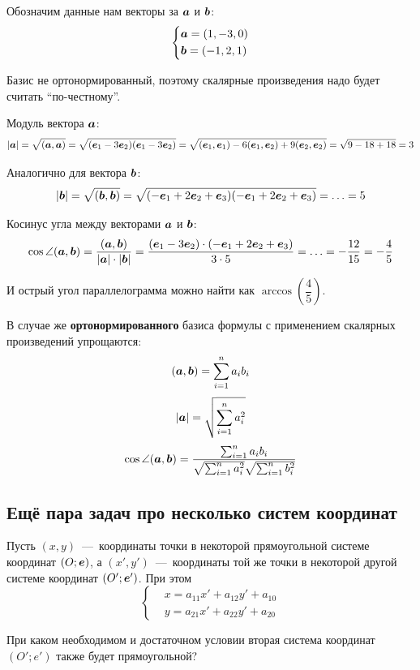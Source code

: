 \documentclass[a4paper,12pt]{article}
\begin{document}
  \begin{solution}
    Обозначим данные нам векторы за $\boldsymbol a$ и $\boldsymbol b$:
    \[
      \left\{
        \begin{aligned}
          &\boldsymbol a = (1, -3, 0)\\
          &\boldsymbol b = (-1, 2, 1)
        \end{aligned}
      \right.
    \]
    
    Базис не ортонормированный, поэтому скалярные произведения надо будет считать ``по-честному''.
    
    Модуль вектора $\boldsymbol a$:
    \[
      |\boldsymbol a| = \sqrt{(\boldsymbol a, \boldsymbol a)} = \sqrt{(\boldsymbol e_1 - 3\boldsymbol e_2)(\boldsymbol e_1 - 3\boldsymbol e_2)}
        = \sqrt{(\boldsymbol e_1, \boldsymbol e_1) - 6(\boldsymbol e_1, \boldsymbol e_2) + 9(\boldsymbol e_2, \boldsymbol e_2)}
        = \sqrt{9 - 18 + 18} = 3
    \]
    
    Аналогично для вектора $\boldsymbol b$:
    \[
      |\boldsymbol b| = \sqrt{(\boldsymbol b, \boldsymbol b)} = \sqrt{(-\boldsymbol e_1 + 2\boldsymbol e_2 + \boldsymbol e_3)(-\boldsymbol e_1 + 2\boldsymbol e_2 + \boldsymbol e_3)}
        = \ldots = 5
    \]
    
    Косинус угла между векторами $\boldsymbol a$ и $\boldsymbol b$:
    \[
      \cos\angle(\boldsymbol a, \boldsymbol b) = \frac{(\boldsymbol a, \boldsymbol b)}{|\boldsymbol a| \cdot |\boldsymbol b|}
        = \frac{(\boldsymbol e_1 - 3\boldsymbol e_2) \cdot (-\boldsymbol e_1 + 2\boldsymbol e_2 + \boldsymbol e_3)}{3 \cdot 5}
        = \ldots = -\frac{12}{15} = -\frac{4}{5}
    \]
    
    И острый угол параллелограмма можно найти как $\arccos{\left(\dfrac{4}{5}\right)}$.
  \end{solution}
  
  В случае же \textbf{ортонормированного} базиса формулы с применением скалярных произведений упрощаются:
  \[
    (\boldsymbol a, \boldsymbol b) = \sum_{i=1}^n a_i b_i
  \]
  \[
    |\boldsymbol a| = \sqrt{\sum_{i=1}^n a_i^2}
  \]
  \[
    \cos\angle(\boldsymbol a, \boldsymbol b) = \frac{\sum_{i=1}^n a_i b_i}{\sqrt{\sum_{i=1}^n a_i^2} \sqrt{\sum_{i=1}^n b_i^2}}
  \]
  
  
  
  
  \subsection{Ещё пара задач про несколько систем координат}
  
  \begin{problem}[4.23]
    Пусть $(x, y)$~---~координаты точки в некоторой прямоугольной системе координат $(O; \boldsymbol e)$, а $(x', y')$~---~координаты той же точки в некоторой другой системе координат $(O'; \boldsymbol e')$.
    При этом
    \[
      \left\{
        \begin{aligned}
          &x = a_{11} x' + a_{12} y' + a_{10}\\
          &y = a_{21} x' + a_{22} y' + a_{20}
        \end{aligned}
      \right.
    \]
    
    При каком необходимом и достаточном условии вторая система координат $(O'; e')$ также будет прямоугольной?
  \end{problem}
  
\end{document}
